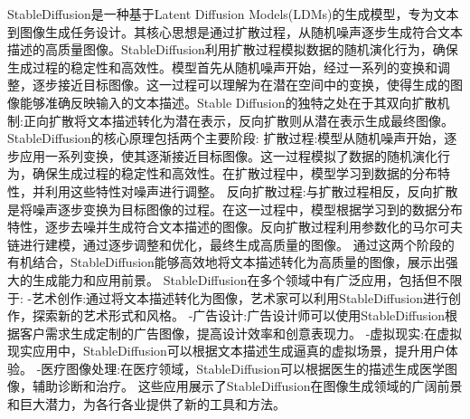 StableDiffusion是一种基于Latent Diffusion Models(LDMs)的生成模型，专为文本到图像生成任务设计。其核心思想是通过扩散过程，从随机噪声逐步生成符合文本描述的高质量图像。StableDiffusion利用扩散过程模拟数据的随机演化行为，确保生成过程的稳定性和高效性。模型首先从随机噪声开始，经过一系列的变换和调整，逐步接近目标图像。这一过程可以理解为在潜在空间中的变换，使得生成的图像能够准确反映输入的文本描述。Stable Diffusion的独特之处在于其双向扩散机制:正向扩散将文本描述转化为潜在表示，反向扩散则从潜在表示生成最终图像。
StableDiffusion的核心原理包括两个主要阶段:
扩散过程:模型从随机噪声开始，逐步应用一系列变换，使其逐渐接近目标图像。这一过程模拟了数据的随机演化行为，确保生成过程的稳定性和高效性。在扩散过程中，模型学习到数据的分布特性，并利用这些特性对噪声进行调整。
反向扩散过程:与扩散过程相反，反向扩散是将噪声逐步变换为目标图像的过程。在这一过程中，模型根据学习到的数据分布特性，逐步去噪并生成符合文本描述的图像。反向扩散过程利用参数化的马尔可夫链进行建模，通过逐步调整和优化，最终生成高质量的图像。
通过这两个阶段的有机结合，StableDiffusion能够高效地将文本描述转化为高质量的图像，展示出强大的生成能力和应用前景。
StableDiffusion在多个领域中有广泛应用，包括但不限于:
-艺术创作:通过将文本描述转化为图像，艺术家可以利用StableDiffusion进行创作，探索新的艺术形式和风格。
-广告设计:广告设计师可以使用StableDiffusion根据客户需求生成定制的广告图像，提高设计效率和创意表现力。
-虚拟现实:在虚拟现实应用中，StableDiffusion可以根据文本描述生成逼真的虚拟场景，提升用户体验。
-医疗图像处理:在医疗领域，StableDiffusion可以根据医生的描述生成医学图像，辅助诊断和治疗。
这些应用展示了StableDiffusion在图像生成领域的广阔前景和巨大潜力，为各行各业提供了新的工具和方法。
